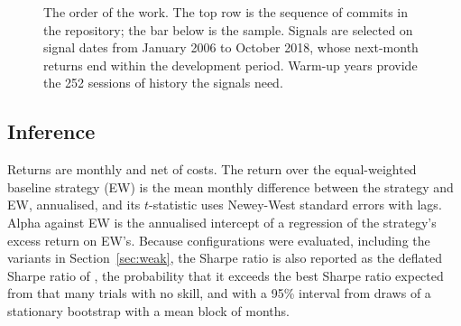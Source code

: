 \documentclass[11pt]{article}
\begin{document}
\begin{figure}[!htbp]
\centering
{}
\caption{The order of the work. The top row is the sequence of commits in the
repository; the bar below is the sample. Signals are selected on signal dates from
January 2006 to October 2018, whose next-month returns end within the development
period. Warm-up years provide the 252 sessions of history the signals need.}
\label{fig:protocol}
\end{figure}

\subsection{Inference}

Returns are monthly and net of costs. The return over the equal-weighted baseline strategy
(EW) is the mean monthly
difference between the strategy and EW, annualised, and its $t$-statistic uses
Newey-West standard errors with \NWLags{} lags. Alpha against EW is the annualised 
intercept of a regression of the strategy's excess return on EW's. Because
\NTrials{} configurations were evaluated, including the variants in
Section~\ref{sec:weak}, the Sharpe ratio is also reported as the deflated Sharpe
ratio of \citet{bailey2014}, the probability that it exceeds the best Sharpe ratio
expected from that many trials with no skill, and with a 95\% interval from
\NBoot{} draws of a stationary bootstrap \citep{politis1994} with a mean block of
\BootBlock{} months.
\end{document}
